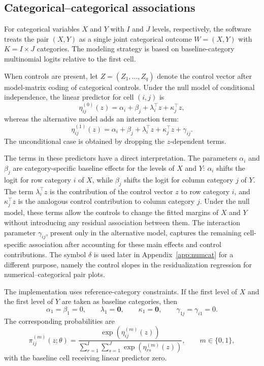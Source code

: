 \documentclass[11pt]{article}
\begin{document}
\subsection{Categorical--categorical associations}
\label{sec:catcat}

For categorical variables $X$ and $Y$ with $I$ and $J$ levels, respectively,
the software treats the pair $(X,Y)$ as a single joint categorical outcome
$W = (X,Y)$ with $K = I \times J$ categories. The modeling strategy is based on
baseline-category multinomial logits relative to the first cell.

When controls are present, let $Z = (Z_1, \dots, Z_q)$ denote the control
vector after model-matrix coding of categorical controls. Under the null model
of conditional independence, the linear predictor for cell $(i,j)$ is
\begin{equation*}
\eta^{(0)}_{ij}(z)
=
\alpha_i + \beta_j + \lambda_i^\top z + \kappa_j^\top z,
\end{equation*}
whereas the alternative model adds an interaction term:
\begin{equation*}
\eta^{(1)}_{ij}(z)
=
\alpha_i + \beta_j + \lambda_i^\top z + \kappa_j^\top z + \gamma_{ij}.
\end{equation*}
The unconditional case is obtained by dropping the $z$-dependent terms.

The terms in these predictors have a direct interpretation. The parameters
$\alpha_i$ and $\beta_j$ are category-specific baseline effects for the levels
of $X$ and $Y$: $\alpha_i$ shifts the logit for row category $i$ of $X$, while
$\beta_j$ shifts the logit for column category $j$ of $Y$. The term
$\lambda_i^\top z$ is the contribution of the control vector $z$ to row
category $i$, and $\kappa_j^\top z$ is the analogous control contribution to
column category $j$. Under the null model, these terms allow the controls to
change the fitted margins of $X$ and $Y$ without introducing any residual
association between them. The interaction parameter $\gamma_{ij}$, present only
in the alternative model, captures the remaining cell-specific association
after accounting for these main effects and control contributions. The symbol
$\delta$ is used later in Appendix~\ref{app:numcat} for a different purpose,
namely the control slopes in the residualization regression for
numerical--categorical pair plots.

The implementation uses reference-category constraints. If the first level of
$X$ and the first level of $Y$ are taken as baseline categories, then
\begin{equation*}
\alpha_1 = \beta_1 = 0,
\qquad
\lambda_1 = \mathbf{0},
\qquad
\kappa_1 = \mathbf{0},
\qquad
\gamma_{1j} = \gamma_{i1} = 0.
\end{equation*}
The corresponding probabilities are
\begin{equation*}
\pi^{(m)}_{ij}(z;\theta) =
\frac{\exp(\eta^{(m)}_{ij}(z))}
{\sum_{r=1}^{I}\sum_{s=1}^{J}\exp(\eta^{(m)}_{rs}(z))},
\qquad m \in \{0,1\},
\end{equation*}
with the baseline cell receiving linear predictor zero.
\end{document}
